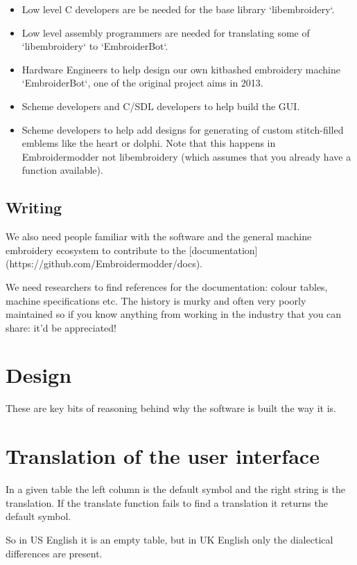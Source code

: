 \documentclass{report}
\begin{document}
\begin{itemize}
\item Low level C developers are be needed for the base library `libembroidery`.
\item Low level assembly programmers are needed for translating some of `libembroidery` to `EmbroiderBot`.
\item Hardware Engineers to help design our own kitbashed embroidery machine `EmbroiderBot`, one of the original project aims in 2013.
\item Scheme developers and C/SDL developers to help build the GUI.
\item Scheme developers to help add designs for generating of custom stitch-filled emblems like the heart or dolphi. Note that this happens in Embroidermodder not libembroidery (which assumes that you already have a function available).
\end{itemize}

\subsection{Writing}

We also need people familiar with the software and the general
machine embroidery ecosystem to contribute to the
[documentation](https://github.com/Embroidermodder/docs).

We need researchers to find references for the documentation: colour tables,
machine specifications etc. The history is murky and often very poorly maintained
so if you know anything from working in the industry that you can share: it'd be
appreciated!

\section{Design}

These are key bits of reasoning behind why the software is built the way it is.

\section{Translation of the user interface}

In a given table the left column is the default symbol
and the right string is the translation. If the translate
function fails to find a translation it returns the default
symbol.

So in US English it is an empty table, but in UK English
only the dialectical differences are present.
\end{document}
